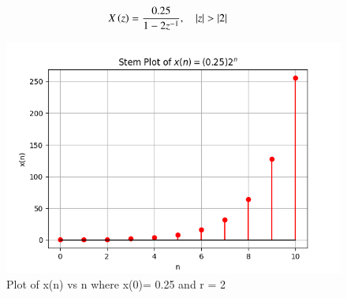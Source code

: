 \documentclass[journal,12pt,twocolumn]{IEEEtran}
\theoremstyle{remark}
\begin{document}
\begin{align}
    X\brak{z} &= \frac{0.25}{1-2z^{-1}}, \quad |z|>|2|
\end{align}

\begin{figure}[htbp]
   \centering
   \includegraphics[width=1\columnwidth]{figs/gp.png}
   \caption{Plot of x(n) vs n where x(0)= 0.25 and r = 2}
   \label{fig: Stem plot of x(n)}
\end{figure}
\end{document}
